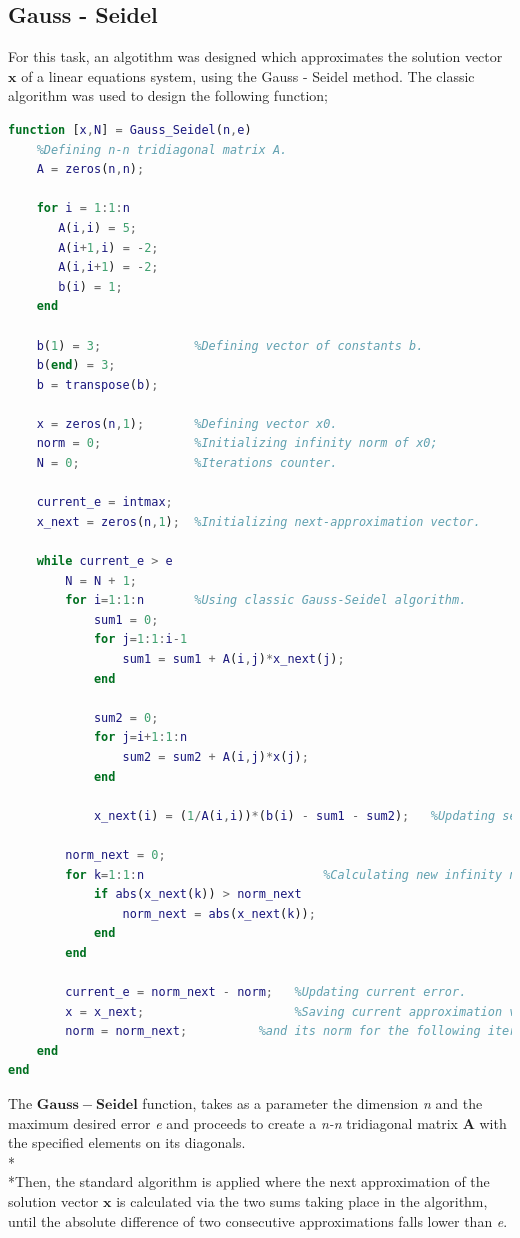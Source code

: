 \documentclass{article}
\begin{document}
\subsection{Gauss - Seidel}
For this task, an algotithm was designed which approximates the solution vector $\mathbf{x}$ of a linear equations system, using the Gauss - Seidel method. The classic algorithm was used to design the following function;
\begin{lstlisting}[language=Matlab]
function [x,N] = Gauss_Seidel(n,e)
    %Defining n-n tridiagonal matrix A. 
    A = zeros(n,n);      
    
    for i = 1:1:n
       A(i,i) = 5;
       A(i+1,i) = -2;
       A(i,i+1) = -2;
       b(i) = 1;
    end

    b(1) = 3;             %Defining vector of constants b.
    b(end) = 3;
    b = transpose(b);
    
    x = zeros(n,1);       %Defining vector x0.
    norm = 0;             %Initializing infinity norm of x0;
    N = 0;                %Iterations counter.
    
    current_e = intmax;
    x_next = zeros(n,1);  %Initializing next-approximation vector.
    
    while current_e > e
        N = N + 1;
        for i=1:1:n       %Using classic Gauss-Seidel algorithm.
            sum1 = 0;
            for j=1:1:i-1
                sum1 = sum1 + A(i,j)*x_next(j);
            end
            
            sum2 = 0;
            for j=i+1:1:n
                sum2 = sum2 + A(i,j)*x(j);
            end
               
            x_next(i) = (1/A(i,i))*(b(i) - sum1 - sum2);   %Updating sequence.
        
        norm_next = 0;
        for k=1:1:n                         %Calculating new infinity norm.
            if abs(x_next(k)) > norm_next
                norm_next = abs(x_next(k));
            end
        end
        
        current_e = norm_next - norm;   %Updating current error.
        x = x_next;                     %Saving current approximation vector.
        norm = norm_next;          %and its norm for the following iteration.
    end
end
\end{lstlisting}
\pagebreak
The $\mathbf{Gauss - Seidel}$ function, takes as a parameter the dimension \emph{n} and the maximum desired error \emph{e} and proceeds to create a \emph{n-n} tridiagonal matrix $\mathbf{A}$ with the specified elements on its diagonals.
\\*\\*Then, the standard algorithm is applied where the next approximation of the solution vector $\mathbf{x}$ is calculated via the two sums taking place in the algorithm, until the absolute difference of two consecutive approximations falls lower than \emph{e}.
\end{document}
